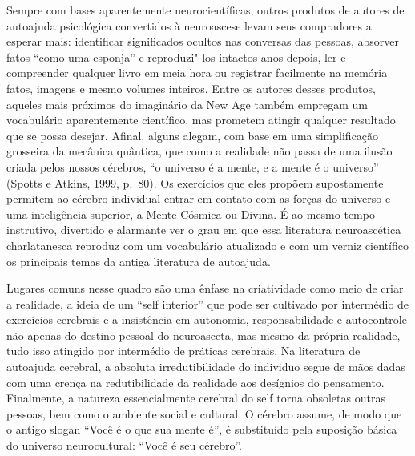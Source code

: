 Sempre com bases aparentemente neurocientíficas, outros produtos de
autores de autoajuda psicológica convertidos à neuroascese levam seus
compradores a esperar mais: identificar significados ocultos nas
conversas das pessoas, absorver fatos ``como uma esponja'' e
reproduzi"-los intactos anos depois, ler e compreender qualquer livro em
meia hora ou registrar facilmente na memória fatos, imagens e mesmo
volumes inteiros. Entre os autores desses produtos, aqueles mais
próximos do imaginário da New Age também empregam um vocabulário
aparentemente científico, mas prometem atingir qualquer resultado que se
possa desejar. Afinal, alguns alegam, com base em uma simplificação
grosseira da mecânica quântica, que como a realidade não passa de uma
ilusão criada pelos nossos cérebros, ``o universo é a mente, e a mente é
o universo'' (Spotts e Atkins, 1999, p.~80). Os exercícios que eles
propõem supostamente permitem ao cérebro individual entrar em contato
com as forças do universo e uma inteligência superior, a Mente Cósmica
ou Divina. É ao mesmo tempo instrutivo, divertido e alarmante ver o grau
em que essa literatura neuroascética charlatanesca reproduz com um
vocabulário atualizado e com um verniz científico os principais temas da
antiga literatura de autoajuda.

Lugares comuns nesse quadro são uma ênfase na criatividade como meio de
criar a realidade, a ideia de um ``self interior'' que pode ser
cultivado por intermédio de exercícios cerebrais e a insistência em
autonomia, responsabilidade e autocontrole não apenas do destino pessoal
do neuroasceta, mas mesmo da própria realidade, tudo isso atingido por
intermédio de práticas cerebrais. Na literatura de autoajuda cerebral, a
absoluta irredutibilidade do individuo segue de mãos dadas com uma
crença na redutibilidade da realidade aos desígnios do pensamento.
Finalmente, a natureza essencialmente cerebral do self torna obsoletas
outras pessoas, bem como o ambiente social e cultural. O cérebro assume,
de modo que o antigo slogan ``Você é o que sua mente é'', é substituído
pela suposição básica do universo neurocultural: ``Você é seu cérebro''.

